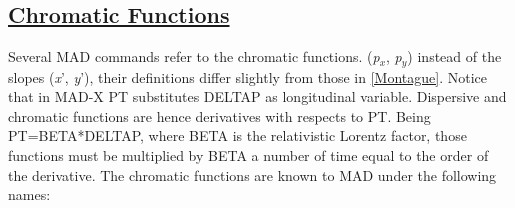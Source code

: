 \subsection{\href{chrom}{Chromatic Functions}} 
Several MAD commands refer to the chromatic functions. (\textit{p$_x$},
\textit{p$_y$}) instead of the slopes (\textit{x}', \textit{y}'), their
definitions differ slightly from those in
\href{bibliography.html#montague}{[Montague]}. Notice that in MAD-X PT
substitutes DELTAP as longitudinal variable. Dispersive and chromatic
functions are hence derivatives with respects to PT. Being
PT=BETA*DELTAP, where BETA is the relativistic Lorentz factor, those
functions must be multiplied by BETA a number of time equal to the order
of the derivative. The chromatic functions are known to MAD under the
following names:  

